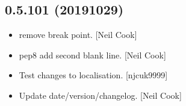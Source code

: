 \documentclass[a4paper,10pt,english]{report}
\begin{document}
\subsection{0.5.101 (2019\sphinxhyphen{}10\sphinxhyphen{}29)}
\label{\detokenize{misc/changelog:id61}}\begin{itemize}
\item {} 
 \sphinxhyphen{} remove break point. {[}Neil Cook{]}

\item {} 
 \sphinxhyphen{} pep8 add second blank line. {[}Neil
Cook{]}

\item {} 
Test changes to localisation. {[}njcuk9999{]}

\item {} 
Update date/version/changelog. {[}Neil Cook{]}

\end{itemize}
\end{document}
